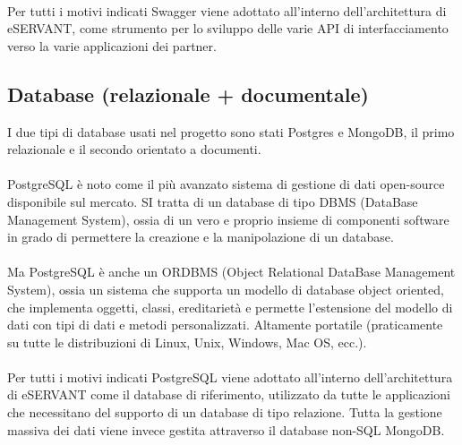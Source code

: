 \paragraph{}

Per tutti i motivi indicati Swagger viene adottato all’interno dell’architettura di
eSERVANT, come strumento per lo sviluppo delle varie API di interfacciamento verso
la varie applicazioni dei partner.


\subsection{Database (relazionale + documentale)}
I due tipi di database usati nel progetto sono stati Postgres e MongoDB, il primo relazionale e il secondo orientato a documenti.
\paragraph{}

PostgreSQL è noto come il più avanzato sistema di gestione di dati open-source
disponibile sul mercato.
SI tratta di un database di tipo DBMS (DataBase Management System), ossia di un vero e proprio insieme di componenti software in grado di permettere la creazione e la manipolazione di un database.
\paragraph{}

Ma PostgreSQL è anche un ORDBMS (Object Relational DataBase Management System), ossia un sistema che supporta un modello di database object oriented, che implementa oggetti, classi, ereditarietà e permette l’estensione del modello di dati con tipi di dati e metodi
personalizzati.
Altamente portatile (praticamente su tutte le distribuzioni di Linux, Unix, Windows, Mac OS, ecc.).
\paragraph{}

Per tutti i motivi indicati PostgreSQL viene adottato all’interno dell’architettura di eSERVANT come il database di riferimento, utilizzato da tutte le applicazioni che necessitano del supporto di un database di tipo relazione.
Tutta la gestione massiva dei dati viene invece gestita attraverso il database non-SQL
MongoDB.
\paragraph{}

